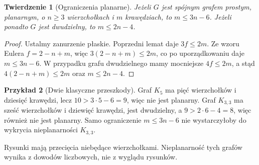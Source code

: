 \documentclass[11pt,a4paper]{report}
\numberwithin{equation}{section}
\theoremstyle{plain}
\newtheorem{twierdzenie}{Twierdzenie}[section]
\theoremstyle{definition}
\newtheorem{przyklad}[twierdzenie]{Przykład}
\theoremstyle{remark}
\begin{document}
\begin{twierdzenie}[Ograniczenia planarne]
\label{thm:tg-planarne-bound}
Jeżeli $G$ jest spójnym grafem prostym, planarnym,
o $n\ge3$ wierzchołkach i $m$ krawędziach, to
$m\le3n-6$. Jeżeli ponadto $G$ jest dwudzielny,
to $m\le2n-4$.
\end{twierdzenie}

\begin{proof}
Ustalmy zanurzenie płaskie. Poprzedni lemat daje
$3f\le2m$. Ze wzoru Eulera $f=2-n+m$,
więc $3(2-n+m)\le2m$, co po uporządkowaniu
daje $m\le3n-6$. W przypadku grafu dwudzielnego
mamy mocniejsze $4f\le2m$, a stąd
$4(2-n+m)\le2m$ oraz $m\le2n-4$.
\end{proof}

\begin{przyklad}[Dwie klasyczne przeszkody]
Graf $K_5$ ma pięć wierzchołków i dziesięć krawędzi,
lecz $10>3\cdot5-6=9$, więc nie jest planarny.
Graf $K_{3,3}$ ma sześć wierzchołków i dziewięć krawędzi,
jest dwudzielny, a $9>2\cdot6-4=8$, więc również
nie jest planarny. Samo ograniczenie $m\le3n-6$
nie wystarczyłoby do wykrycia nieplanarności $K_{3,3}$.
\end{przyklad}

\begin{center}

{\footnotesize Rysunki mają przecięcia niebędące wierzchołkami.
Nieplanarność tych grafów wynika z dowodów liczbowych, nie z wyglądu rysunków.}
\end{center}
\end{document}
